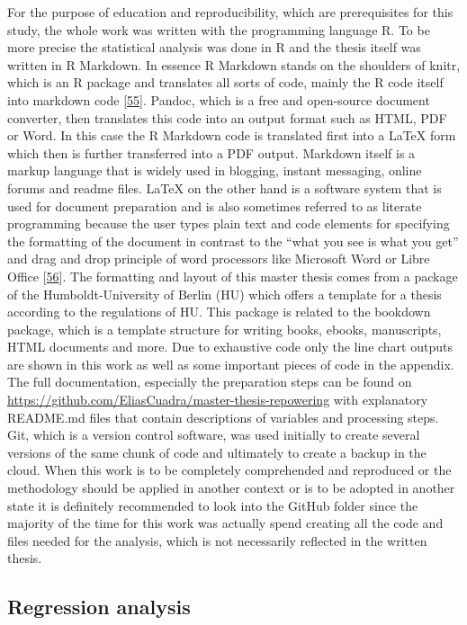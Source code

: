 \documentclass[a4paper,11pt]{article}
\begin{document}
For the purpose of education and reproducibility, which are prerequisites for this study, the whole work was written with the programming language R. To be more precise the statistical analysis was done in R and the thesis itself was written in R Markdown. In essence R Markdown stands on the shoulders of knitr, which is an R package and translates all sorts of code, mainly the R code itself into markdown code {[}\protect\hyperlink{ref-YihuiXieJ.J.AllaireGarrettGrolemund.2021}{55}{]}. Pandoc, which is a free and open-source document converter, then translates this code into an output format such as HTML, PDF or Word. In this case the R Markdown code is translated first into a LaTeX form which then is further transferred into a PDF output. Markdown itself is a markup language that is widely used in blogging, instant messaging, online forums and readme files. LaTeX on the other hand is a software system that is used for document preparation and is also sometimes referred to as literate programming because the user types plain text and code elements for specifying the formatting of the document in contrast to the ``what you see is what you get'' and drag and drop principle of word processors like Microsoft Word or Libre Office {[}\protect\hyperlink{ref-LaTeX.2021}{56}{]}. The formatting and layout of this master thesis comes from a package of the Humboldt-University of Berlin (HU) which offers a template for a thesis according to the regulations of HU. This package is related to the bookdown package, which is a template structure for writing books, ebooks, manuscripts, HTML documents and more. Due to exhaustive code only the line chart outputs are shown in this work as well as some important pieces of code in the appendix. The full documentation, especially the preparation steps can be found on \url{https://github.com/EliasCuadra/master-thesis-repowering} with explanatory README.md files that contain descriptions of variables and processing steps. Git, which is a version control software, was used initially to create several versions of the same chunk of code and ultimately to create a backup in the cloud. When this work is to be completely comprehended and reproduced or the methodology should be applied in another context or is to be adopted in another state it is definitely recommended to look into the GitHub folder since the majority of the time for this work was actually spend creating all the code and files needed for the analysis, which is not necessarily reflected in the written thesis.

\hypertarget{regression-analysis}{%
\subsection{Regression analysis}\label{regression-analysis}}
\end{document}
